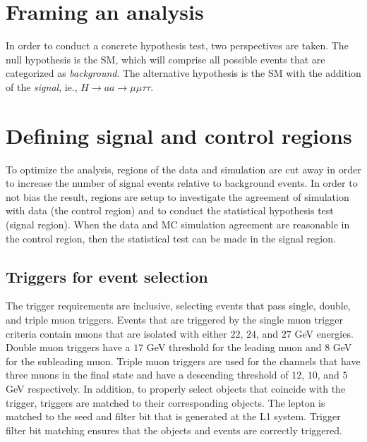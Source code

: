 \section{Framing an analysis}
In order to conduct a concrete hypothesis test, two perspectives are taken. 
The null hypothesis is the SM, which will comprise all possible events that are categorized as \textit{background}.
The alternative hypothesis is the SM with the addition of the \textit{signal}, ie., $H \rightarrow a a \rightarrow \mu\mu\tau\tau$. 

\section{Defining signal and control regions}
To optimize the analysis, regions of the data and simulation are cut away in order to increase the number of signal events relative to background events.  In order to not bias the result, regions are setup to investigate the agreement of simulation with data (the control region) and to conduct the statistical hypothesis test (signal region). When the data and MC simulation agreement are reasonable in the control region, then the statistical test can be made in the signal region.  

\subsection{Triggers for event selection}
\label{sec:trig}
The trigger requirements are inclusive, selecting events that pass single, double, and triple muon triggers. Events that are triggered by the single muon trigger criteria contain muons that are isolated with either $22$, $24$, and $27$ GeV energies. Double muon triggers have a $17$ GeV threshold for the leading muon and $8$ GeV for the subleading muon. Triple muon triggers are used for the channels that have three muons in the final state and have a descending threshold of $12$, $10$, and $5$ GeV respectively. In addition, to properly select objects that coincide with the trigger, triggers are matched to their corresponding objects. The lepton is matched to the seed and filter bit that is generated at the L1 system. Trigger filter bit matching ensures that the objects and events are correctly triggered. 

